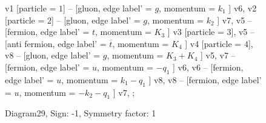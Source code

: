 \documentclass{revtex4}
\begin{document}
\begin{figure}[!htb]
\begin{center}
{    %
v1 [particle = \(1\)] -- [gluon, edge label' = \(g\), momentum = \(k_{1}\) ] v6, 
v2 [particle = \(2\)] -- [gluon, edge label' = \(g\), momentum = \(k_{2}\) ] v7, 
v5 -- [fermion, edge label' = \(t\), momentum = \(K_{3}\) ] v3 [particle = \(3\)], 
v5 -- [anti fermion, edge label' = \(\overline{t}\), momentum = \(K_{4}\) ] v4 [particle = \(4\)], 
v8 -- [gluon, edge label' = \(g\), momentum = \(K_{3} + K_{4}\) ] v5, 
v7 -- [fermion, edge label' = \(u\), momentum = \(-q_{1}\) ] v6, 
v6 -- [fermion, edge label' = \(u\), momentum = \(k_{1} - q_{1}\) ] v8, 
v8 -- [fermion, edge label' = \(u\), momentum = \(-k_{2} - q_{1}\) ] v7, 
};
\end{center}
\caption{Diagram29, Sign: -1, Symmetry factor: 1}
\end{figure}
\newpage
\end{document}
